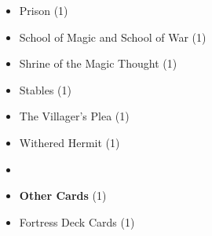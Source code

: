\begin{multicols*}{3}
\begin{itemize}[leftmargin=0pt, label={}, noitemsep, noitemsep]
  \item Prison (1)
  \item School of Magic and School of War (1)
  \item Shrine of the Magic Thought (1)
  \item Stables (1)
  \item The Villager's Plea (1)
  \item Withered Hermit (1)
  \item
  \item \textbf{Other Cards} (1)
  \item Fortress Deck Cards (1)
\end{itemize}

\end{multicols*}

